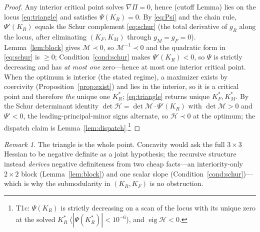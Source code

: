 \documentclass[11pt,reqno]{amsart}
\theoremstyle{plain}
\theoremstyle{definition}
\theoremstyle{remark}
\newtheorem{remark}{Remark}
\newcommand{\KR}{K_R}
\newcommand{\KF}{K_F}
\newcommand{\KM}{K_M}
\newcommand{\KRs}{K_R^{*}}
\newcommand{\KFs}{K_F^{*}}
\newcommand{\KMs}{K_M^{*}}
\newcommand{\Hcal}{\mathcal H}
\begin{document}
\begin{proof}
Any interior critical point solves $\nabla\Pi=0$, hence (cutoff
Lemma) lies on the locus \eqref{eq:triangle} and satisfies $\Psi(\KR)=0$. By
\eqref{eq:Psi} and the chain rule, $\Psi'(\KR)$ equals the Schur complement
\eqref{eq:schur} (the total derivative of $g_R$ along the locus, after eliminating
$(\KF,\KM)$ through $g_M=g_F=0$). Lemma~\ref{lem:block} gives
$\mathcal M\prec0$, so $\mathcal M^{-1}\prec0$ and the quadratic form in
\eqref{eq:schur} is $\ge0$; Condition~\ref{cond:schur} makes $\Psi'(\KR)<0$, so
$\Psi$ is strictly decreasing and has \emph{at most one} zero---hence at most one
interior critical point. When the optimum is interior (the stated regime), a
maximizer exists by coercivity (Proposition~\ref{prop:exist}) and lies in the
interior, so it is a critical point and therefore \emph{the} unique one $\KRs$;
\eqref{eq:triangle} returns unique $\KFs,\KMs$. By the Schur determinant identity
$\det\Hcal=\det\mathcal M\cdot\Psi'(\KR)$ with $\det\mathcal M>0$ and $\Psi'<0$,
the leading-principal-minor signs alternate, so $\Hcal\prec0$ at the optimum; the
dispatch claim is Lemma~\ref{lem:dispatch}.\footnote{T1c: $\Psi(\KR)$ is strictly
decreasing on a scan of the locus with its unique zero at the solved $\KRs$
($|\Psi(\KRs)|<10^{-6}$), and $\operatorname{eig}\Hcal<0$.}
\end{proof}

\begin{remark}
The triangle is the whole point. Concavity would ask the full $3\times3$ Hessian
to be negative definite as a joint hypothesis; the recursive structure instead
\emph{derives} negative definiteness from two cheap facts---an interiority-only
$2\times2$ block (Lemma~\ref{lem:block}) and one scalar slope
(Condition~\ref{cond:schur})---which is why the submodularity in $(\KR,\KF)$ is no
obstruction.
\end{remark}
\end{document}
